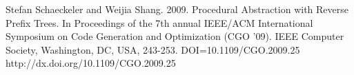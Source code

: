 \documentclass[9pt,nocopyrightspace]{sigplanconf}
\begin{document}



\begin{thebibliography}{}
\softraggedright

Stefan Schaeckeler and Weijia Shang. 2009. Procedural Abstraction with Reverse Prefix Trees. In Proceedings of the 7th annual IEEE/ACM International Symposium on Code Generation and Optimization (CGO '09). IEEE Computer Society, Washington, DC, USA, 243-253. DOI=10.1109/CGO.2009.25 http://dx.doi.org/10.1109/CGO.2009.25

\end{thebibliography}
\end{document}
